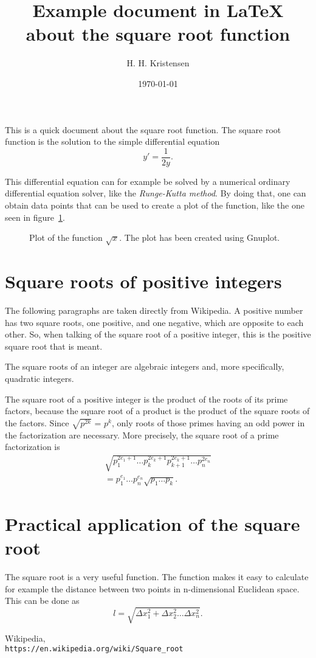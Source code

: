 \documentclass[twocolumn]{article}
\title{Example document in \LaTeX{} about the square root function}
\author{H. H. Kristensen}
\date{\today}
\begin{document}
\maketitle

\noindent This is a quick document about the square root function. The square root function is the solution to the simple differential equation
%
\begin{equation}\label{eq:test}
y' = \frac{1}{2y}.
\end{equation}

This differential equation can for example be solved by a numerical ordinary differential equation solver, like the \emph{Runge-Kutta method}. By doing that, one can obtain data points that can be used to create a plot of the function, like the one seen in figure~\ref{fig:sqrtplot}.


\begin{figure}[h]

\caption{Plot of the function $\sqrt{x}$. The plot has been created using Gnuplot.}
\label{fig:sqrtplot}
\end{figure}

\section{Square roots of positive integers}
The following paragraphs are taken directly from Wikipedia\cite{wiki}. A positive number has two square roots, one positive, and one negative, which are opposite to each other. So, when talking of the square root of a positive integer, this is the positive square root that is meant. 

The square roots of an integer are algebraic integers and, more specifically, quadratic integers.

The square root of a positive integer is the product of the roots of its prime factors, because the square root of a product is the product of the square roots of the factors. Since $\sqrt{p^{2k}}$ = $p^k$, only roots of those primes having an odd power in the factorization are necessary. More precisely, the square root of a prime factorization is 
%
\begin{multline}
\sqrt{p_1^{2e_1 + 1} \dots p_k^{2e_k + 1} p_{k+1}^{2e_k+1} \dots p_n^{2e_n}} \\
= p_1^{e_1} \dots p_n^{e_n} \sqrt{p_1 \dots p_k} .
\end{multline}


\section{Practical application of the square root}

The square root is a very useful function. The function makes it easy to calculate for example the distance between two points in n-dimensional Euclidean space. This can be done as
%
\begin{equation}
l = \sqrt{\Delta x_1^2 + \Delta x_2^2 \dots \Delta x_n^2}.
\end{equation}


\begin{thebibliography}{9}
Wikipedia,
\\\texttt{https://en.wikipedia.org/wiki/Square\_root}
\end{thebibliography}
\end{document}
